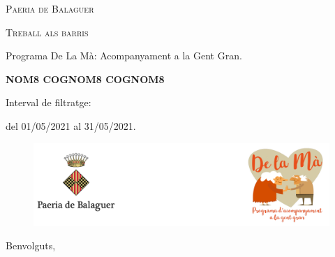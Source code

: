 \documentclass[a4paper,12pt]{elsarticle}  %
\begin{document}
 	


\begin{titlepage}
	\centering

	{\scshape\LARGE Paeria de Balaguer \par}


			\vfill


	{\scshape\Large Treball als barris\par}

	
			\vspace{0.5cm}

	
	{\Large Programa De La Mà: Acompanyament a la Gent Gran.\par}

			

			\vfill



	{\Large\bfseries NOM8 COGNOM8 COGNOM8 \par}
	


			\vfill



	{\large Interval de filtratge:\par}
	{\large del 01/05/2021 al 31/05/2021.\par}
		

\end{titlepage}



\clearpage







\FloatBarrier
\begin{figure}[h]
	\centering	
	\includegraphics[width=1\textwidth]{../IMATGES/logoPaeriaMa.png}
\end{figure}
\FloatBarrier	

\vfill









\noindent Benvolguts,

	\vspace{0.5cm}
\end{document}
